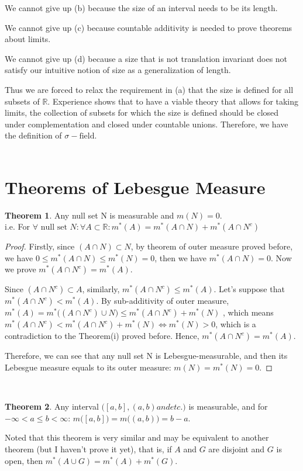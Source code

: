 \documentclass[reqno]{amsart}
\theoremstyle{definition}
\newtheorem{theorem}{Theorem}
\begin{document}
We cannot give up (b) because the size of an interval needs to be its length. 

We cannot give up (c) because countable additivity is needed to prove theorems about limits. 

We cannot give up (d) because a size that is not translation invariant does not satisfy our intuitive notion of size as a generalization of length.

Thus we are forced to relax the requirement in (a) that the size is defined for all subsets of $\mathbb{R}$. Experience shows that to have a viable theory that allows for taking
limits, the collection of subsets for which the size is defined should be closed under
complementation and closed under countable unions. Therefore, we have the definition of $\sigma-\mbox{field}$.\\
~\\
\section{Theorems of Lebesgue Measure}

\begin{theorem}
Any null set N is measurable and $m(N) = 0$.\\
i.e. For $\forall \mbox{ null set } N: \forall A \subset \mathbb{R}: m^{*}(A) = m^{*}(A \cap N) + m^{*}(A \cap N^{c})$
\end{theorem}

\begin{proof}
Firstly, since $(A \cap N) \subset N$, by theorem of outer measure proved before, we have $0 \leq m^{*}(A \cap N) \leq m^{*}(N) = 0$, then we have $m^{*}(A \cap N) = 0$. Now we prove $m^{*}(A \cap N^{c}) = m^{*}(A)$.

Since $(A \cap N^{c}) \subset A$, similarly, $m^{*}(A \cap N^{c}) \leq m^{*}(A)$. Let's suppose that $m^{*}(A \cap N^{c}) < m^{*}(A)$. By sub-additivity of outer measure, $m^{*}(A) = m^{*}\big((A \cap N^{c})\cup N\big) \leq m^{*}(A \cap N^{c}) + m^{*}(N)$ , which means $m^{*}(A \cap N^{c}) < m^{*}(A \cap N^{c}) + m^{*}(N) \iff m^{*}(N) > 0$, which is a contradiction to the Theorem(i) proved before. Hence, $m^{*}(A \cap N^{c}) = m^{*}(A)$.

Therefore, we can see that any null set N is Lebesgue-measurable, and then its Lebesgue measure equals to its outer measure: $m(N) = m^{*}(N) = 0$.
\end{proof}
~\\
\begin{theorem}{\mbox{}}
Any interval $\big([a, b], (a, b) and etc.\big)$ is measurable, and for $-\infty < a \leq b < \infty$: $m\big([a, b]\big) = m\big((a, b)\big) = b - a$.

Noted that this theorem is very similar and may be equivalent to another theorem (but I haven't prove it yet), that is, if $A$ and $G$ are disjoint and $G$ is open, then $m^{*}(A \cup G) = m^{*}(A) + m^{*}(G)$.
\end{theorem}
\end{document}
